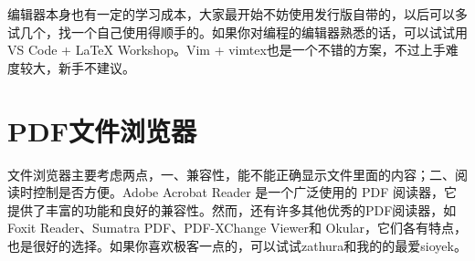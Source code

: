编辑器本身也有一定的学习成本，大家最开始不妨使用发行版自带的，以后可以多试几个，找一个自己使用得顺手的。如果你对编程的编辑器熟悉的话，可以试试用VS
Code + LaTeX Workshop。Vim + vimtex也是一个不错的方案，不过上手难度较大，新手不建议。

\section{PDF文件浏览器}
文件浏览器主要考虑两点，一、兼容性，能不能正确显示文件里面的内容；二、阅读时控制是否方便。Adobe Acrobat Reader
是一个广泛使用的 PDF 阅读器，它提供了丰富的功能和良好的兼容性。然而，还有许多其他优秀的PDF阅读器，如 Foxit
Reader、Sumatra PDF、PDF-XChange Viewer和
Okular，它们各有特点，也是很好的选择。如果你喜欢极客一点的，可以试试zathura和我的的最爱sioyek。
